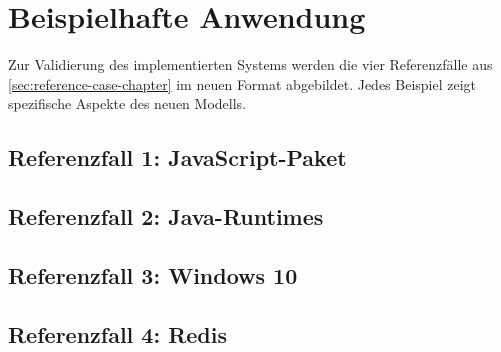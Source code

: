 \section{Beispielhafte Anwendung}\label{sec:beispiele-fertige-implementierung}

Zur Validierung des implementierten Systems werden die vier Referenzfälle aus \autoref{sec:reference-case-chapter} im neuen Format abgebildet.
Jedes Beispiel zeigt spezifische Aspekte des neuen Modells.

\subsection{Referenzfall 1: JavaScript-Paket}\label{subsec:example-js-package}

\subsection{Referenzfall 2: Java-Runtimes}\label{subsec:example-java-runtimes}

\subsection{Referenzfall 3: Windows 10}\label{subsec:example-windows}

\subsection{Referenzfall 4: Redis}\label{subsec:example-redis}
